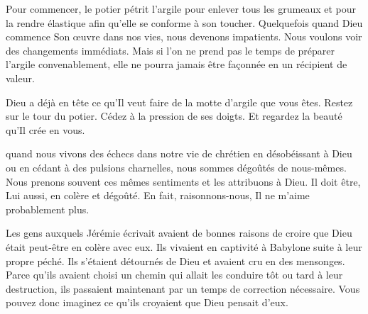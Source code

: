 
Pour commencer, le potier pétrit l'argile pour enlever tous les grumeaux
 et pour la rendre élastique afin qu'elle se conforme à son toucher.
 Quelquefois quand Dieu commence Son œuvre dans nos vies,
 nous devenons impatients. Nous voulons voir des changements immédiats.
 Mais si l'on ne prend pas le temps de préparer l'argile convenablement,
 elle ne pourra jamais être façonnée en un récipient de valeur. 

Dieu a déjà en tête ce qu'Il veut faire de la motte d'argile que vous êtes.
 Restez sur le tour du potier. Cédez à la pression de ses doigts.
 Et regardez la beauté qu'Il crée en vous. 

\dvrule







 quand nous vivons des échecs
 dans notre vie de chrétien en désobéissant à Dieu ou en cédant
 à des pulsions charnelles, nous sommes dégoûtés de nous-mêmes.
 Nous prenons souvent ces mêmes sentiments et les attribuons à Dieu.
 \og Il doit être, Lui aussi, en colère et dégoûté.
 En fait, 
 raisonnons-nous, 
 Il ne m'aime probablement plus. \fg{}


Les gens auxquels Jérémie écrivait avaient de bonnes raisons de croire
 que Dieu était peut-être en colère avec eux. Ils vivaient en captivité
 à Babylone suite à leur propre péché. Ils s'étaient détournés de Dieu
 et avaient cru en des mensonges. Parce qu'ils avaient choisi un chemin
 qui allait les conduire tôt ou tard à leur destruction,
 ils passaient maintenant par un temps de correction nécessaire.
 Vous pouvez donc imaginez ce qu'ils croyaient que Dieu pensait d'eux. 


